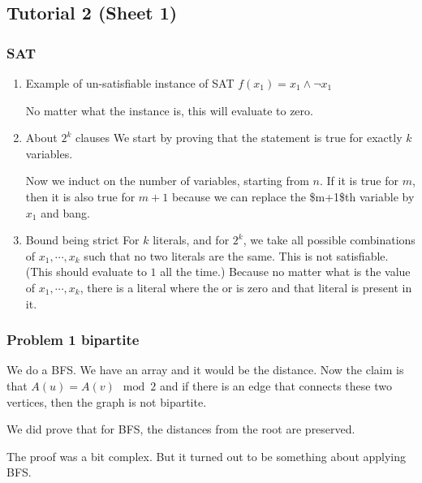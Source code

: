 \documentclass[11pt]{article}
\begin{document}
\subsection{Tutorial 2 (Sheet 1)}
\label{sec:org8c272c1}
\subsubsection{SAT}
\label{sec:org59bf0fb}
\begin{enumerate}
\item Example of un-satisfiable instance of SAT
\label{sec:org8534665}
\(f(x_1) = x_1 \wedge \neg x_1\)

No matter what the instance is, this will evaluate to zero.
\item About \(2^k\) clauses
\label{sec:orgbb0b6ad}
We start by proving that the statement is true for exactly \(k\) variables.

Now we induct on the number of variables, starting from \(n\). If it is true
for \(m\), then it is also true for \(m+1\) because we can replace the \$m+1\$th
variable by \(x_1\) and bang.
\item Bound being strict
\label{sec:org313c990}
For \(k\) literals, and for \(2^k\), we take all possible combinations of \(x_1,
     \cdots, x_k\) such that no two literals are the same. This is not
satisfiable. (This should evaluate to \(1\) all the time.) Because no matter
what is the value of \(x_1, \cdots, x_k\), there is a literal where the or is
zero and that literal is present in it.
\end{enumerate}
\subsubsection{Problem 1 bipartite}
\label{sec:org3471f76}
We do a BFS. We have an array and it would be the distance. Now the claim is
that \(A(u) = A(v) \mod 2\) and if there is an edge that connects these two
vertices, then the graph is not bipartite.

We did prove that for BFS, the distances from the root are preserved.

The proof was a bit complex. But it turned out to be something about
applying BFS.
\end{document}
